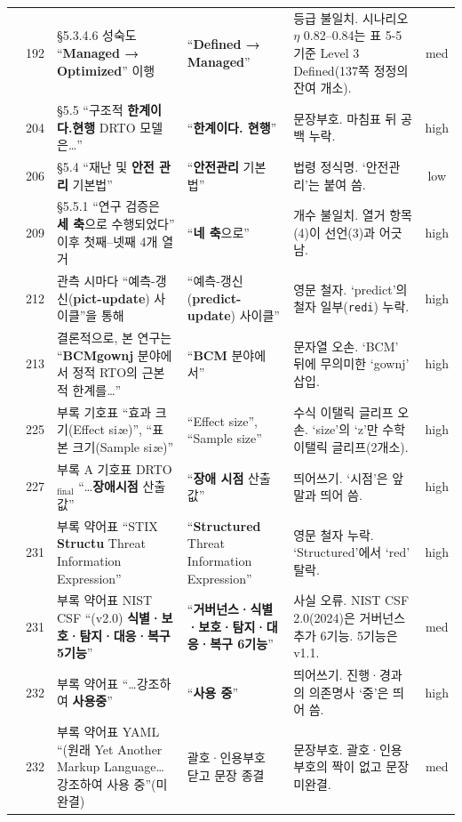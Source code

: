 \documentclass[11pt,a4paper]{article}
\newcommand{\err}[1]{{\color{errred}\textbf{#1}}}
\begin{document}
\begin{longtable}{@{}c c >{\RaggedRight}p{4.6cm} >{\RaggedRight}p{3.0cm} >{\RaggedRight}p{3.4cm} c@{}}
\addlinespace
57 & 192 & \S5.3.4.6 성숙도 ``\err{Managed → Optimized}'' 이행 & ``\err{Defined → Managed}'' & 등급 불일치. 시나리오 $\eta$ 0.82--0.84는 표 5-5 기준 Level 3 Defined(137쪽 정정의 잔여 개소). & med \\
\addlinespace
58 & 204 & \S5.5 ``구조적 \err{한계이다.현행} DRTO 모델은…'' & ``\err{한계이다. 현행}'' & 문장부호. 마침표 뒤 공백 누락. & high \\
\addlinespace
59 & 206 & \S5.4 ``재난 및 \err{안전 관리} 기본법'' & ``\err{안전관리} 기본법'' & 법령 정식명. `안전관리'는 붙여 씀. & low \\
\addlinespace
60 & 209 & \S5.5.1 ``연구 검증은 \err{세 축}으로 수행되었다'' 이후 첫째–넷째 4개 열거 & ``\err{네 축}으로'' & 개수 불일치. 열거 항목(4)이 선언(3)과 어긋남. & high \\
\addlinespace
61 & 212 & 관측 시마다 ``예측-갱신(\err{pict-update}) 사이클''을 통해 & ``예측-갱신(\err{predict-update}) 사이클'' & 영문 철자. `predict'의 철자 일부(\texttt{redi}) 누락. & high \\
\addlinespace
62 & 213 & 결론적으로, 본 연구는 ``\err{BCMgownj} 분야에서 정적 RTO의 근본적 한계를…'' & ``\err{BCM} 분야에서'' & 문자열 오손. `BCM' 뒤에 무의미한 `gownj' 삽입. & high \\
\addlinespace
63 & 225 & 부록 기호표 ``효과 크기(Effect si\textit{z}e)'', ``표본 크기(Sample si\textit{z}e)'' & ``Effect size'', ``Sample size'' & 수식 이탤릭 글리프 오손. `size'의 `z'만 수학 이탤릭 글리프(2개소). & high \\
\addlinespace
64 & 227 & 부록 A 기호표 DRTO$_{\text{final}}$ ``…\err{장애시점} 산출값'' & ``\err{장애 시점} 산출값'' & 띄어쓰기. `시점'은 앞말과 띄어 씀. & high \\
\addlinespace
65 & 231 & 부록 약어표 ``STIX \err{Structu} Threat Information Expression'' & ``\err{Structured} Threat Information Expression'' & 영문 철자 누락. `Structured'에서 `red' 탈락. & high \\
\addlinespace
66 & 231 & 부록 약어표 NIST CSF ``(v2.0) \err{식별·보호·탐지·대응·복구 5기능}'' & ``\err{거버넌스·식별·보호·탐지·대응·복구 6기능}'' & 사실 오류. NIST CSF 2.0(2024)은 거버넌스 추가 6기능. 5기능은 v1.1. & med \\
\addlinespace
67 & 232 & 부록 약어표 ``…강조하여 \err{사용중}'' & ``\err{사용 중}'' & 띄어쓰기. 진행·경과의 의존명사 `중'은 띄어 씀. & high \\
\addlinespace
68 & 232 & 부록 약어표 YAML ``(원래 Yet Another Markup Language… 강조하여 사용 중''(미완결) & 괄호·인용부호 닫고 문장 종결 & 문장부호. 괄호·인용부호의 짝이 없고 문장 미완결. & med \\

\end{longtable}
\end{document}
